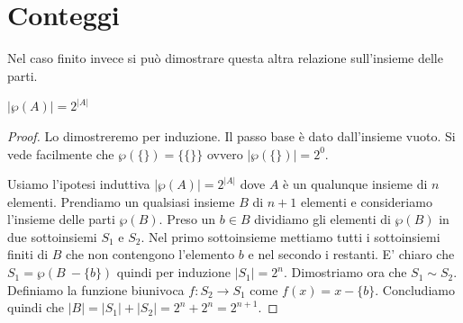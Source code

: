 \section{Conteggi}
Nel caso finito invece si può dimostrare questa altra relazione sull'insieme delle parti.
\begin{theorem}{}
    $|\wp(A)| = 2^{|A|} $
\end{theorem}
\begin{proof}
    Lo dimostreremo per induzione. Il passo base è dato dall'insieme vuoto. Si vede facilmente che $\wp(\{ \}) = \{\{\}\}$ ovvero $|\wp(\{ \})| = 2^{0}$.

    Usiamo l'ipotesi induttiva $|\wp(A)| = 2^{|A|}$ dove $A$ è un qualunque insieme di $n$ elementi. Prendiamo un qualsiasi insieme $B$ di $n+1$ elementi e consideriamo l'insieme delle parti $\wp(B)$. Preso un $b\in B$ dividiamo gli elementi di $\wp(B)$ in due sottoinsiemi $S_1$ e $S_2$. Nel primo sottoinsieme mettiamo tutti i sottoinsiemi finiti di $B$ che non contengono l'elemento $b$ e nel secondo i restanti. E' chiaro che $S_1 = \wp(B\ - \{b\}) $ quindi per induzione $|S_1| = 2^{n}$. Dimostriamo ora che $S_1 \sim S_2$. Definiamo la funzione biunivoca $f:S_2 \rightarrow S_1$ come
    $f(x) = x-\{ b \}$. Concludiamo quindi che $|B| = |S_1|+|S_2| = 2^n+2^n = 2^{n+1}$.
\end{proof}
